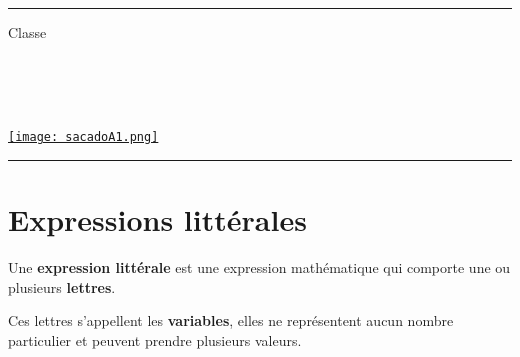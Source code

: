 \documentclass[a4paper,dvipsnames]{article}
\begin{document}

\fancyhead[C]{}
\hrule\medskip %
\begin{minipage}{0.295\textwidth} 
\raggedright
Classe \myClasse \hfill\\
\myDiscipline \hfill\\
\myParcours \hfill\\
\end{minipage}
\begin{minipage}{0.4\textwidth} 
\centering 
\scshape\huge
\textcolor{sacado_purple}{\myTitle} \\ 
\normalsize 
\end{minipage}
\begin{minipage}{0.295\textwidth} 
\raggedleft
\href{https://sacado.xyz/}{\texttt{[image: sacadoA1.png]}}
\end{minipage}
\medskip \hrule
\bigskip


%





\section{Expressions littérales}

\begin{Def}
Une \textbf{expression littérale} est une expression mathématique qui comporte une ou plusieurs \textbf{lettres}.

Ces lettres s'appellent les \textbf{variables}, elles ne représentent aucun nombre particulier et peuvent prendre plusieurs valeurs.
\end{Def}
\end{document}
